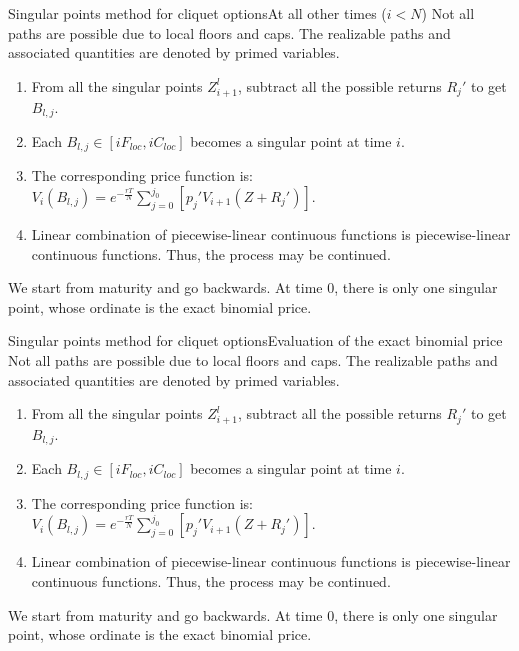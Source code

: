 \documentclass[utf8,t,compress,xcolor=svgnames,handout]{beamer}
\begin{document}
	
	\begin{frame}{Singular points method for cliquet options}{At all other times ($ i < N $)}
		Not all paths are possible due to local floors and caps. The realizable paths and associated quantities are denoted by primed variables.
		\begin{enumerate}
			\item From all the singular points $ Z_{i+1}^l $, subtract all the possible returns $ R_j' $ to get $ B_{l,j} $.
			\item Each $ B_{l,j} \in [ i F_{loc}, i C_{loc} ] $ becomes a singular point at time $ i $.
			\item The corresponding price function is: $ V_i (B_{l,j}) = e^{- \frac{rT}{N}} \sum_{j=0}^{j_0} \left[ p_j' V_{i+1} (Z + R_j') \right] $.
			\item Linear combination of piecewise-linear continuous functions is piecewise-linear continuous functions. Thus, the process may be continued.
		\end{enumerate}
		We start from maturity and go backwards. At time 0, there is only one singular point, whose ordinate is the exact binomial price.
	\end{frame}
	
	
	\begin{frame}{Singular points method for cliquet options}{Evaluation of the exact binomial price}
		Not all paths are possible due to local floors and caps. The realizable paths and associated quantities are denoted by primed variables.
		\begin{enumerate}
			\item From all the singular points $ Z_{i+1}^l $, subtract all the possible returns $ R_j' $ to get $ B_{l,j} $.
			\item Each $ B_{l,j} \in [ i F_{loc}, i C_{loc} ] $ becomes a singular point at time $ i $.
			\item The corresponding price function is: $ V_i (B_{l,j}) = e^{- \frac{rT}{N}} \sum_{j=0}^{j_0} \left[ p_j' V_{i+1} (Z + R_j') \right] $.
			\item Linear combination of piecewise-linear continuous functions is piecewise-linear continuous functions. Thus, the process may be continued.
		\end{enumerate}
		We start from maturity and go backwards. At time 0, there is only one singular point, whose ordinate is the exact binomial price.
	\end{frame}
	
\end{document}
